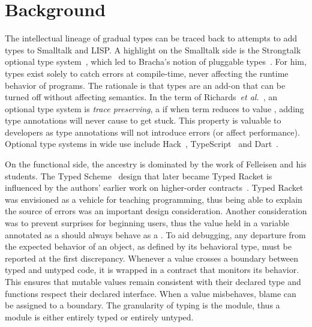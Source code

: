 \documentclass[a4paper,USenglish]{tex/lipics-v2016}
\begin{document}

\section{Background}


\noindent The intellectual lineage of gradual types can be traced back to
attempts to add types to Smalltalk and LISP. A highlight on the Smalltalk
side is the Strongtalk optional type system~\cite{Bracha93}, which led to
Bracha's notion of pluggable types~\cite{pluggabletypes}. For him, types
exist solely to catch errors at compile-time, never affecting the runtime
behavior of programs. The rationale is that types are an add-on that can be
turned off without affecting semantics.  In the term of Richards~\emph{et
  al.}~\cite{ecoop15}, an optional type system is \emph{trace preserving}, a
if when term \e reduces to value \a, adding type annotations will never
cause \e to get stuck. This property is valuable to developers as type
annotations will not introduce errors (or affect performance).  Optional
type systems in wide use include Hack~\cite{hack13}, TypeScript~\cite{BAT14}
and Dart~\cite{dart13}.

On the functional side, the ancestry is dominated by the work of Felleisen
and his students.  The Typed Scheme~\cite{tf-popl08} design that later
became Typed Racket is influenced by the authors' earlier work on
higher-order contracts~\cite{ff-icfp02}. Typed Racket was envisioned as a
vehicle for teaching programming, thus being able to explain the source of
errors was an important design consideration. Another consideration was to
prevent surprises for beginning users, thus the value held in a variable
annotated as a \C should always behave as a \C. To aid debugging, any
departure from the expected behavior of an object, as defined by its
behavioral type, must be reported at the first discrepancy.  Whenever a value
crosses a boundary between typed and untyped code, it is wrapped in a
contract that monitors its behavior. This ensures that mutable values
remain consistent with their declared type and functions respect their
declared interface. When a value misbehaves, blame can be assigned to a
boundary. The granularity of typing is the module, thus a module is either
entirely typed or entirely untyped. 
\end{document}
